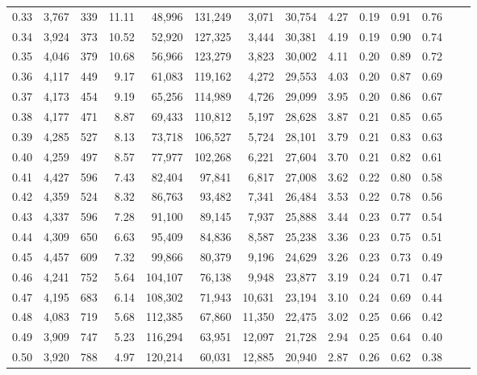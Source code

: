 \begin{tabular}{rrrrrrrrrrrrrr}
0.33 &  3,767 &  339 &   11.11 &   48,996 &  131,249 &   3,071 &  30,754 &  4.27 &  0.19 &  0.91 &      0.76 \\
0.34 &  3,924 &  373 &   10.52 &   52,920 &  127,325 &   3,444 &  30,381 &  4.19 &  0.19 &  0.90 &      0.74 \\
0.35 &  4,046 &  379 &   10.68 &   56,966 &  123,279 &   3,823 &  30,002 &  4.11 &  0.20 &  0.89 &      0.72 \\
0.36 &  4,117 &  449 &    9.17 &   61,083 &  119,162 &   4,272 &  29,553 &  4.03 &  0.20 &  0.87 &      0.69 \\
0.37 &  4,173 &  454 &    9.19 &   65,256 &  114,989 &   4,726 &  29,099 &  3.95 &  0.20 &  0.86 &      0.67 \\
0.38 &  4,177 &  471 &    8.87 &   69,433 &  110,812 &   5,197 &  28,628 &  3.87 &  0.21 &  0.85 &      0.65 \\
0.39 &  4,285 &  527 &    8.13 &   73,718 &  106,527 &   5,724 &  28,101 &  3.79 &  0.21 &  0.83 &      0.63 \\
0.40 &  4,259 &  497 &    8.57 &   77,977 &  102,268 &   6,221 &  27,604 &  3.70 &  0.21 &  0.82 &      0.61 \\
0.41 &  4,427 &  596 &    7.43 &   82,404 &   97,841 &   6,817 &  27,008 &  3.62 &  0.22 &  0.80 &      0.58 \\
0.42 &  4,359 &  524 &    8.32 &   86,763 &   93,482 &   7,341 &  26,484 &  3.53 &  0.22 &  0.78 &      0.56 \\
0.43 &  4,337 &  596 &    7.28 &   91,100 &   89,145 &   7,937 &  25,888 &  3.44 &  0.23 &  0.77 &      0.54 \\
0.44 &  4,309 &  650 &    6.63 &   95,409 &   84,836 &   8,587 &  25,238 &  3.36 &  0.23 &  0.75 &      0.51 \\
0.45 &  4,457 &  609 &    7.32 &   99,866 &   80,379 &   9,196 &  24,629 &  3.26 &  0.23 &  0.73 &      0.49 \\
0.46 &  4,241 &  752 &    5.64 &  104,107 &   76,138 &   9,948 &  23,877 &  3.19 &  0.24 &  0.71 &      0.47 \\
0.47 &  4,195 &  683 &    6.14 &  108,302 &   71,943 &  10,631 &  23,194 &  3.10 &  0.24 &  0.69 &      0.44 \\
0.48 &  4,083 &  719 &    5.68 &  112,385 &   67,860 &  11,350 &  22,475 &  3.02 &  0.25 &  0.66 &      0.42 \\
0.49 &  3,909 &  747 &    5.23 &  116,294 &   63,951 &  12,097 &  21,728 &  2.94 &  0.25 &  0.64 &      0.40 \\
0.50 &  3,920 &  788 &    4.97 &  120,214 &   60,031 &  12,885 &  20,940 &  2.87 &  0.26 &  0.62 &      0.38 \\

\end{tabular}
